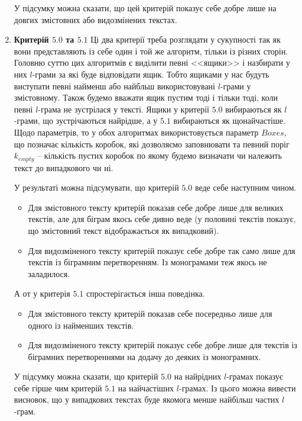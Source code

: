 \begin{enumerate}
        У підсумку можна сказати, що цей критерій показує себе добре лише на довгих змістовних або видозмінених текстах.
        
    \item \textbf{Критерій $5.0$ та $5.1$}
        Ці два критерії треба розглядати у сукупності так як вони представляють із себе один і той же алгоритм, тільки із різних сторін. Головню суттю цих алгоритмів є виділити певні <<ящики>> і назбирати у них $l$-грами за які буде відповідати ящик. Тобто ящиками у нас будуть виступати певні найменш або найбльш використовувані $l$-грами у змістовному. Також будемо вважати ящик пустим тоді і тільки тоді, коли певні $l$-грама не зустрілася у тексті. Ящики у критерії $5.0$ вибираються як $l$-грами, що зустрічаються найрідше, а у $5.1$ вибираються як щонайчастіше. Щодо параметрів, то у обох алгоритмах використовується параметр $Boxes$, що позначає кількість коробок, які дозволяємо заповнювати та певний поріг $k_{empty}$ -- кількість пустих коробок по якому будемо визначати чи належить текст до випадкового чи ні. 

         У результаті можна підсумувати, що критерій $5.0$ веде себе наступним чином.
        \begin{itemize}
            \item Для змістовного тексту критерій показав себе добре лише для великих текстів, але для біграм якось себе дивно веде (у половині текстів показує, що змістовний текст відображається як випадковий).
            \item Для видозміненого тексту критерій показує себе добре так само лише для текстів із біграмним перетворенням. Із монограмами теж якось не заладилося. 
        \end{itemize}

         А от у критерія $5.1$ спростерігається інша поведінка.
        \begin{itemize}
            \item Для змістовного тексту критерій показав себе посередньо лише для одного із найменших текстів.
            \item Для видозміненого тексту критерій показує себе добре лише для текстів із біграмних перетвореннями на додачу до деяких із монограмних. 
        \end{itemize}
        
        У підсумку можна сказати, що критерій $5.0$ на найрідних $l$-грамах показує себе гірше чим критерій $5.1$ на найчастіших $l$-грамах. Із цього можна вивести висновок, що у випадкових текстах буде якомога менше найбільш частих $l$-грам. 
    

\end{enumerate}

